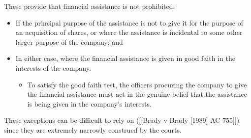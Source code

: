 \documentclass[
]{article}
\providecommand{\tightlist}{%
  \setlength{\itemsep}{0pt}\setlength{\parskip}{0pt}}
\begin{document}
These provide that financial assistance is not prohibited:

\begin{itemize}
\tightlist
\item
  If the principal purpose of the assistance is not to give it for the
  purpose of an acquisition of shares, or where the assistance is
  incidental to some other larger purpose of the company; and
\item
  In either case, where the financial assistance is given in good faith
  in the interests of the company.

  \begin{itemize}
  \tightlist
  \item
    To satisfy the good faith test, the officers procuring the company
    to give the financial assistance must act in the genuine belief that
    the assistance is being given in the company's interests.
  \end{itemize}
\end{itemize}

These exceptions can be difficult to rely on ({[}{[}Brady v Brady
{[}1989{]} AC 755{]}{]}) since they are extremely narrowly construed by
the courts.
\end{document}

